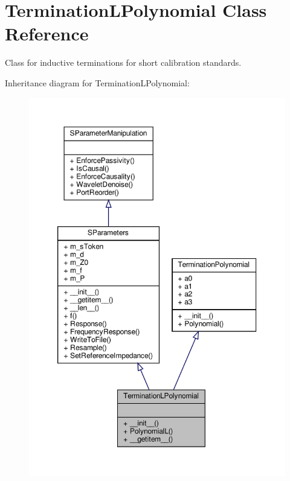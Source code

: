 \hypertarget{classSignalIntegrity_1_1Measurement_1_1CalKit_1_1Standards_1_1TerminationPolynomial_1_1TerminationLPolynomial}{}\section{Termination\+L\+Polynomial Class Reference}
\label{classSignalIntegrity_1_1Measurement_1_1CalKit_1_1Standards_1_1TerminationPolynomial_1_1TerminationLPolynomial}


Class for inductive terminations for short calibration standards.  




Inheritance diagram for Termination\+L\+Polynomial\+:
\nopagebreak
\begin{figure}[H]
\begin{center}
\leavevmode
\includegraphics[width=350pt]{classSignalIntegrity_1_1Measurement_1_1CalKit_1_1Standards_1_1TerminationPolynomial_1_1TerminationLPolynomial__inherit__graph}
\end{center}
\end{figure}


